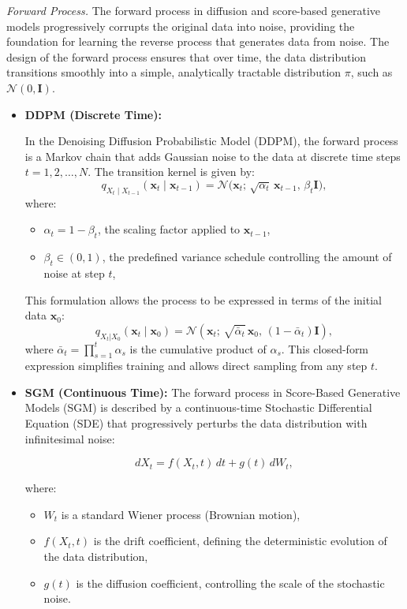 \textit{Forward Process.} The forward process in diffusion and score-based generative models progressively corrupts the original data into noise, providing the foundation for learning the reverse process that generates data from noise. The design of the forward process ensures that over time, the data distribution transitions smoothly into a simple, analytically tractable distribution $\pi$, such as \( \mathcal{N}(0, \mathbf{I}) \).

\begin{itemize}
    \item \textbf{DDPM (Discrete Time):}
    
    In the Denoising Diffusion Probabilistic Model (DDPM), the forward process is a Markov chain that adds Gaussian noise to the data at discrete time steps \( t = 1, 2, \dots, N \). The transition kernel is given by:
    \[
    q_{X_t \mid X_{t-1}}(\mathbf{x}_t \mid \mathbf{x}_{t-1}) = \mathcal{N}\bigl(\mathbf{x}_t;\, \sqrt{\alpha_t} \, \mathbf{x}_{t-1},\, \beta_t \mathbf{I}\bigr),
    \]
    where:
    \begin{itemize}
        \item \( \alpha_t = 1 - \beta_t \), the scaling factor applied to \( \mathbf{x}_{t-1} \),
        \item \( \beta_t \in (0, 1) \), the predefined variance schedule controlling the amount of noise at step \( t \),
    \end{itemize}
    This formulation allows the process to be expressed in terms of the initial data \( \mathbf{x}_0 \):
    \[
    q_{X_t|X_0}(\mathbf{x}_t \mid \mathbf{x}_0) = \mathcal{N}\left(\mathbf{x}_t;\, \sqrt{\bar{\alpha}_t} \, \mathbf{x}_0,\, (1 - \bar{\alpha}_t) \mathbf{I}\right),
    \]
    where \( \bar{\alpha}_t = \prod_{s=1}^t \alpha_s \) is the cumulative product of \( \alpha_s \). This closed-form expression simplifies training and allows direct sampling from any step \( t \).

    \item \textbf{SGM (Continuous Time):} The forward process in Score-Based Generative Models (SGM) is described by a continuous-time Stochastic Differential Equation (SDE) that progressively perturbs the data distribution with infinitesimal noise:

\[
dX_t = f(X_t, t) \, dt + g(t) \, dW_t,
\]

where:
\begin{itemize}
    \item \( W_t \) is a standard Wiener process (Brownian motion),
    \item \( f(X_t, t) \) is the drift coefficient, defining the deterministic evolution of the data distribution,
    \item \( g(t) \) is the diffusion coefficient, controlling the scale of the stochastic noise.
\end{itemize}


\end{itemize}
